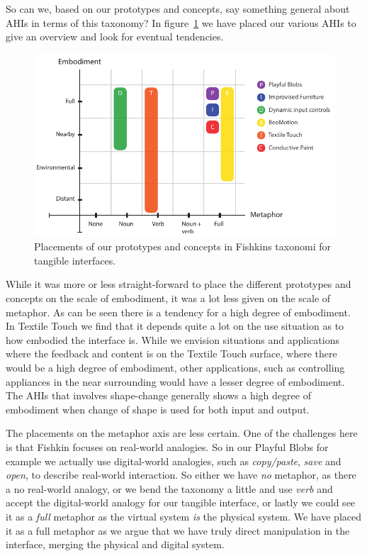 So can we, based on our prototypes and concepts, say something general about AHIs in terms of this taxonomy?
In figure~\ref{fig:ch:adhoc2:fishkin} we have placed our various AHIs to give an overview and look for eventual tendencies. 

\begin{figure}[h]
  \centering
  \includegraphics[width=.9\textwidth]{figures/adhoc2/fishkin.pdf}
  \caption{Placements of our prototypes and concepts in Fishkins taxonomi for tangible interfaces.}
  \label{fig:ch:adhoc2:fishkin}
\end{figure}

While it was more or less straight-forward to place the different prototypes and concepts on the scale of embodiment, it was a lot less given on the scale of metaphor.
As can be seen there is a tendency for a high degree of embodiment.
In Textile Touch we find that it depends quite a lot on the use situation as to how embodied the interface is.
While we envision situations and applications where the feedback and content is on the Textile Touch surface, where there would be a high degree of embodiment, other applications, such as controlling appliances in the near surrounding would have a lesser degree of embodiment.
The AHIs that involves shape-change generally shows a high degree of embodiment when change of shape is used for both input and output.

The placements on the metaphor axis are less certain.
One of the challenges here is that Fishkin focuses on real-world analogies.
So in our Playful Blobs for example we actually use digital-world analogies, such as \emph{copy/paste}, \emph{save} and \emph{open}, to describe real-world interaction.
So either we have \emph{no} metaphor, as there a no real-world analogy, or we bend the taxonomy a little and use \emph{verb} and accept the digital-world analogy for our tangible interface, or lastly we could see it as a \emph{full} metaphor as the virtual system \emph{is} the
physical system. 
We have placed it as a full metaphor as we argue that we have truly direct manipulation in the interface, merging the physical and digital system.

